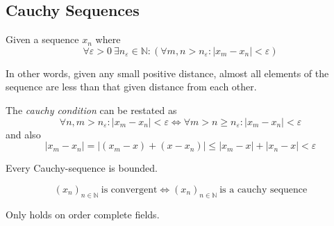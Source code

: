 \subsection{Cauchy Sequences}
\begin{definition}
   Given a sequence \(x_n\) where
   \[\forall \varepsilon > 0~\exists n_\varepsilon \in \mathbb{N}: (\forall m, n > n_\varepsilon: |x_m - x_n| < \varepsilon)\]
\end{definition}
\begin{remark}
   In other words, given any small positive distance, almost all elements of the sequence are less than that given distance from each other.
\end{remark}
\begin{remark}
   The \emph{cauchy condition} can be restated as
   \[\forall n, m > n_\varepsilon: |x_m - x_n| < \varepsilon \iff \forall m > n \geq n_\varepsilon: |x_m - x_n| < \varepsilon\]
   and also
   \[|x_m - x_n| = |(x_m - x) + (x - x_n)| \leq |x_m - x| + |x_n - x| < \varepsilon\]
\end{remark}

\begin{theorem}\label{thm:cauchy_bound}
   Every Cauchy-sequence is bounded.
\end{theorem}

\begin{theorem}\label{thm:cauchy_crit_seq}
   \[(x_n)_{n \in \mathbb{N}}~\text{is convergent} \iff (x_n)_{n \in \mathbb{N}}~\text{is a cauchy sequence}\]
\end{theorem}
\begin{remark}
   Only holds on order complete fields.
\end{remark}

